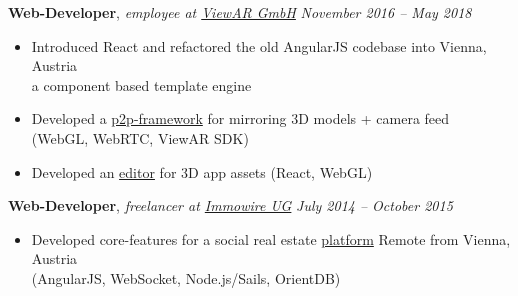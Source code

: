 \documentclass[9pt]{extarticle}
\begin{document}
\noindent
{\bf Web-Developer}, \textit{employee at \href{https://viewar.com}{ViewAR GmbH}}  \hfill \textit{November 2016 -- May 2018}
\begin{itemize}
\setlength\itemsep{0.05em}
    \item Introduced React and refactored the old AngularJS codebase into \hfill Vienna, Austria \\
    a component based template engine
    \item Developed a \href{https://www.youtube.com/watch?v=0j-v-j9xEUQ}{p2p-framework} for mirroring 3D models + camera feed \\
    (WebGL, WebRTC, ViewAR SDK)
    \item Developed an \href{https://www.youtube.com/watch?v=quE-erJ4PmU&t=113s}{editor} for 3D app assets (React, WebGL) \\
\end{itemize}

\noindent
{\bf Web-Developer}, \textit{freelancer at \href{https://youtu.be/cs-IyI_erZo?t=16}{Immowire UG}}  \hfill \textit{July 2014 -- October 2015}
\begin{itemize}
    \setlength\itemsep{0.05em}
\item Developed core-features for a social real estate  \href{https://youtu.be/cs-IyI_erZo?t=16}{platform} \hfill Remote from Vienna, Austria \\ 
(AngularJS, WebSocket, Node.js/Sails, OrientDB)\\
\end{itemize}

\end{document}

